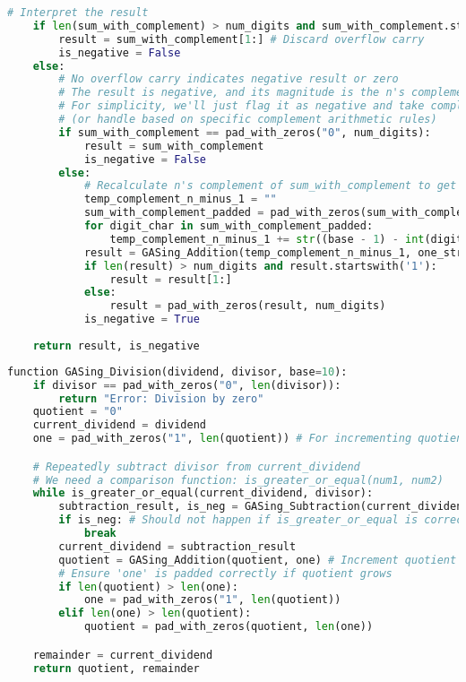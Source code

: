 \begin{lstlisting}[language=Python,caption={GASing Subtraction Algorithm}]
    # Interpret the result
    if len(sum_with_complement) > num_digits and sum_with_complement.startswith('1'): # Overflow carry indicates positive result
        result = sum_with_complement[1:] # Discard overflow carry
        is_negative = False
    else:
        # No overflow carry indicates negative result or zero
        # The result is negative, and its magnitude is the n's complement of sum_with_complement
        # For simplicity, we'll just flag it as negative and take complement again for magnitude
        # (or handle based on specific complement arithmetic rules)
        if sum_with_complement == pad_with_zeros("0", num_digits):
            result = sum_with_complement
            is_negative = False
        else:
            # Recalculate n's complement of sum_with_complement to get magnitude
            temp_complement_n_minus_1 = ""
            sum_with_complement_padded = pad_with_zeros(sum_with_complement, num_digits)
            for digit_char in sum_with_complement_padded:
                temp_complement_n_minus_1 += str((base - 1) - int(digit_char))
            result = GASing_Addition(temp_complement_n_minus_1, one_str) # Magnitude
            if len(result) > num_digits and result.startswith('1'):
                result = result[1:]
            else:
                result = pad_with_zeros(result, num_digits)
            is_negative = True
            
    return result, is_negative
\end{lstlisting}

\begin{lstlisting}[language=Python,caption={GASing Division Algorithm}]
function GASing_Division(dividend, divisor, base=10):
    if divisor == pad_with_zeros("0", len(divisor)):
        return "Error: Division by zero"
    quotient = "0"
    current_dividend = dividend
    one = pad_with_zeros("1", len(quotient)) # For incrementing quotient

    # Repeatedly subtract divisor from current_dividend
    # We need a comparison function: is_greater_or_equal(num1, num2)
    while is_greater_or_equal(current_dividend, divisor):
        subtraction_result, is_neg = GASing_Subtraction(current_dividend, divisor, base)
        if is_neg: # Should not happen if is_greater_or_equal is correct
            break 
        current_dividend = subtraction_result
        quotient = GASing_Addition(quotient, one) # Increment quotient
        # Ensure 'one' is padded correctly if quotient grows
        if len(quotient) > len(one):
            one = pad_with_zeros("1", len(quotient))
        elif len(one) > len(quotient):
            quotient = pad_with_zeros(quotient, len(one))

    remainder = current_dividend
    return quotient, remainder
\end{lstlisting}

